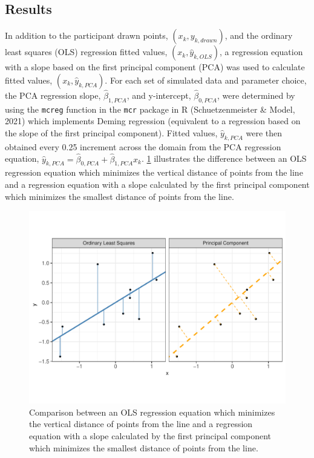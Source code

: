\documentclass[print]{nuthesis}
\begin{document}
\hypertarget{results-1}{%
\subsection{Results}\label{results-1}}

In addition to the participant drawn points, \((x_k, y_{k,drawn})\), and the ordinary least squares (OLS) regression fitted values, \((x_k, \hat y_{k,OLS})\), a regression equation with a slope based on the first principal component (PCA) was used to calculate fitted values, \((x_k, \hat y_{k,PCA})\).
For each set of simulated data and parameter choice, the PCA regression slope, \(\hat\beta_{1,PCA}\), and y-intercept, \(\hat\beta_{0,PCA}\), were determined by using the \texttt{mcreg} function in the \texttt{mcr} package in R (Schuetzenmeister \& Model, 2021) which implements Deming regression (equivalent to a regression based on the slope of the first principal component).
Fitted values, \(\hat y_{k,PCA}\) were then obtained every 0.25 increment across the domain from the PCA regression equation, \(\hat y_{k,PCA} = \hat\beta_{0,PCA} + \hat\beta_{1,PCA} x_k\).
\cref{fig:ols-vs-pca-example} illustrates the difference between an OLS regression equation which minimizes the vertical distance of points from the line and a regression equation with a slope calculated by the first principal component which minimizes the smallest distance of points from the line.

\begin{figure}[tbp]

{\centering \includegraphics[width=1\linewidth,]{thesis_files/figure-latex/ols-vs-pca-example-1} 

}

\caption[OLS vs PCA Regression Lines]{Comparison between an OLS regression equation which minimizes the vertical distance of points from the line and a regression equation with a slope calculated by the first principal component which minimizes the smallest distance of points from the line.}\label{fig:ols-vs-pca-example}
\end{figure}
\end{document}
